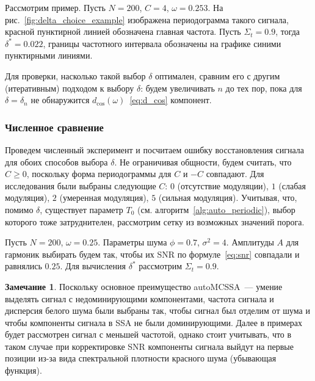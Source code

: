 \documentclass[specialist,
substylefile = spbu_report.rtx,
subf,12pt]{disser}
\theoremstyle{definition}
\newtheorem{remark}{Замечание}[chapter]
\begin{document}
Рассмотрим пример. Пусть $N=200$, $C=4$, $\omega=0.253$. На рис.~\ref{fig:delta_choice_example} изображена периодограмма такого сигнала, красной пунктирной линией обозначена главная частота.
Пусть $\Sigma_t=0.9$, тогда $\delta^*=0.022$, границы частотного интервала обозначены на графике синими пунктирными линиями.

Для проверки, насколько такой выбор $\delta$ оптимален, сравним его с другим (итеративным) подходом к выбору $\delta$: будем увеличивать $n$ до тех пор, пока для $\delta=\delta_{n}$ не обнаружится $d_{\cos}(\omega)$~\eqref{eq:d_cos} компонент.

\subsubsection{Численное сравнение}\label{sect:delta_choice_numerical_research}

Проведем численный эксперимент и посчитаем ошибку восстановления сигнала для обоих способов выбора $\delta$. Не ограничивая общности, будем считать, что $C\geqslant0$, поскольку форма периодограммы для $C$ и $-C$ совпадают. Для исследования были выбраны следующие $C$: $0$ (отсутствие модуляции), $1$ (слабая модуляция), $2$ (умеренная модуляция), $5$ (сильная модуляция). Учитывая, что, помимо $\delta$, существует параметр $T_0$ (см. алгоритм~\ref{alg:auto_periodic}), выбор которого тоже затруднителен, рассмотрим сетку из возможных значений порога.

Пусть $N=200$, $\omega=0.25$. Параметры шума $\phi=0.7$, $\sigma^2=4$. Амплитуды $A$ для гармоник выбирать будем так, чтобы их SNR по формуле~\eqref{eq:snr} совпадали и равнялись $0.25$. Для вычисления $\delta^*$ рассмотрим $\Sigma_t=0.9$.

\begin{remark}
	Поскольку основное преимущество autoMCSSA~--- умение выделять сигнал с недоминирующими компонентами, частота сигнала и дисперсия белого шума были выбраны так, чтобы сигнал был отделим от шума и чтобы компоненты сигнала в SSA не были доминирующими. Далее в примерах будет рассмотрен сигнал с меньшей частотой, однако стоит учитывать, что в таком случае при корректировке SNR компоненты сигнала выйдут на первые позиции из-за вида спектральной плотности красного шума (убывающая функция).
\end{remark}
\end{document}

